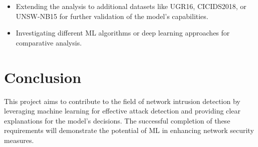 \begin{itemize}
    \item Extending the analysis to additional datasets like UGR16, CICIDS2018, or UNSW-NB15 for further validation of the model's capabilities.
    \item Investigating different ML algorithms or deep learning approaches for comparative analysis.
\end{itemize}

\section{Conclusion}
This project aims to contribute to the field of network intrusion detection by leveraging machine learning for effective attack detection and providing clear explanations for the model's decisions. The successful completion of these requirements will demonstrate the potential of ML in enhancing network security measures.
